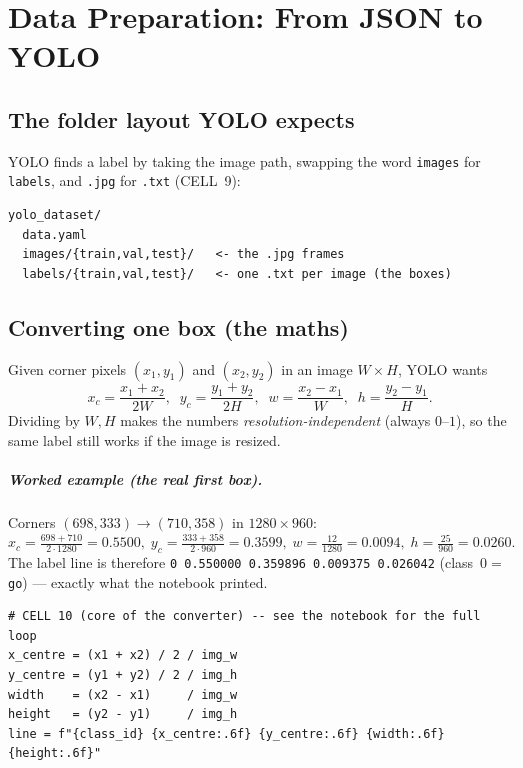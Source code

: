 \chapter{Data Preparation: From JSON to YOLO}
\label{ch:dataprep}

\section{The folder layout YOLO expects}
YOLO finds a label by taking the image path, swapping the word
\texttt{images} for \texttt{labels}, and \texttt{.jpg} for \texttt{.txt}
(CELL~9):
\begin{verbatim}
yolo_dataset/
  data.yaml
  images/{train,val,test}/   <- the .jpg frames
  labels/{train,val,test}/   <- one .txt per image (the boxes)
\end{verbatim}

\section{Converting one box (the maths)}
\begin{keyconcept}
Given corner pixels $(x_1,y_1)$ and $(x_2,y_2)$ in an image
$W\times H$, YOLO wants
\[
x_c=\frac{x_1+x_2}{2W},\;\; y_c=\frac{y_1+y_2}{2H},\;\;
w=\frac{x_2-x_1}{W},\;\; h=\frac{y_2-y_1}{H}.
\]
Dividing by $W,H$ makes the numbers \emph{resolution-independent}
(always $0$--$1$), so the same label still works if the image is resized.
\end{keyconcept}

\paragraph{Worked example (the real first box).}
Corners $(698,333)\to(710,358)$ in $1280\times960$:
\[
x_c=\tfrac{698+710}{2\cdot1280}=0.5500,\;
y_c=\tfrac{333+358}{2\cdot960}=0.3599,\;
w=\tfrac{12}{1280}=0.0094,\;
h=\tfrac{25}{960}=0.0260.
\]
The label line is therefore \texttt{0 0.550000 0.359896 0.009375 0.026042}
(class~$0=$\,\texttt{go}) --- exactly what the notebook printed.

\begin{verbatim}
# CELL 10 (core of the converter) -- see the notebook for the full loop
x_centre = (x1 + x2) / 2 / img_w
y_centre = (y1 + y2) / 2 / img_h
width    = (x2 - x1)     / img_w
height   = (y2 - y1)     / img_h
line = f"{class_id} {x_centre:.6f} {y_centre:.6f} {width:.6f} {height:.6f}"
\end{verbatim}

